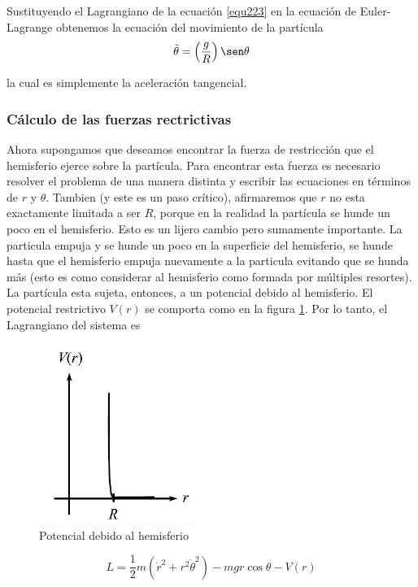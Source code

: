 \documentclass[12pt]{book}
\theoremstyle{definition}
\theoremstyle{remark}
\theoremstyle{plain}
\begin{document}
Sustituyendo el Lagrangiano de la ecuación \ref{equ223} en la ecuación de Euler- Lagrange obtenemos la ecuación del movimiento de la partícula
\begin{equation}
\label{equ224}
\ddot{\theta}=\left ( \frac{g}{R} \right ) \sen \theta 
\end{equation}

la cual es simplemente la aceleración tangencial.
\subsubsection{Cálculo de las fuerzas rectrictivas}
Ahora supongamos que deseamos encontrar la fuerza de restricción que el hemisferio ejerce sobre la partícula. Para encontrar esta fuerza es necesario resolver el problema de una manera distinta y escribir las ecuaciones en términos de $r$ y $\theta$. Tambien (y este es un paso crítico), afirmaremos que $r$ no esta exactamente limitada a ser $R$, porque en la realidad la partícula se hunde un poco en el hemisferio. Esto es un lijero cambio pero sumamente importante. La particula empuja y se hunde un poco en la superficie del hemisferio, se hunde hasta que el hemisferio empuja nuevamente a la particula evitando que se hunda más (esto es como considerar al hemisferio como formada por múltiples resortes). La partícula esta sujeta, entonces, a un potencial debido al hemisferio. El potencial restrictivo $V(r)$ se comporta como en la figura \ref{fig10}. Por lo tanto, el Lagrangiano del sistema es

\begin{figure}
\centering
\includegraphics[width=2in]{Potencialhemisferio.jpg}
\caption{Potencial debido al hemisferio}
\label{fig10}
\end{figure}

\begin{equation}
\label{equ225}
L = \frac{1}{2} m (\dot{r}^2 + r^2 \dot{\theta}^2)-m g r \cos \theta - V(r)
\end{equation}
\end{document}
